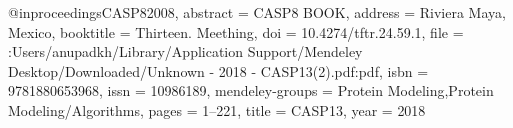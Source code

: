 @inproceedings{CASP82008,
abstract = {CASP8 BOOK},
address = {Riviera Maya, Mexico},
booktitle = {Thirteen. Meething},
doi = {10.4274/tftr.24.59.1},
file = {:Users/anupadkh/Library/Application Support/Mendeley Desktop/Downloaded/Unknown - 2018 - CASP13(2).pdf:pdf},
isbn = {9781880653968},
issn = {10986189},
mendeley-groups = {Protein Modeling,Protein Modeling/Algorithms},
pages = {1--221},
title = {{CASP13}},
year = {2018}
}
